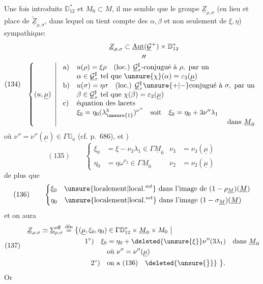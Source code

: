 Une fois introduits \(\mathbb D_{12}^{*}\) et \(M_0\subset M\), il me
semble que le groupe \(\underline Z_{\rho,\sigma}\) (en lieu
et place de \(\underline{\widetilde Z}_{\rho,\sigma}\), dans lequel on tient
compte des \(\alpha,\beta\) et non seulement
de \(\xi,\eta\))  sympathique:
\[
(134)\quad
\begin{gathered}
\underline Z_{\rho,\sigma}\subset
\underline{\operatorname{Aut}}(\underline{\mathcal G}^{+})\times\mathbb D_{12}^{*}
\\[-2pt]
\text{\(\prime\prime\)}\\[-2pt]
\left\{(u,\underline\mu)\ \left|\
\begin{array}{ll}
\text{a)}&u(\rho)=\xi\rho\quad\text{(loc.) }\underline{\mathcal G}_{\tau}^{\sharp}\text{-conjugué à }\rho,\text{ par un}\\
&\alpha\in\underline{\mathcal G}_{\tau}^{\sharp}\text{ tel que }\unsure{\chi}(\alpha)=\varepsilon_3(\underline\mu)\\
\text{b)}&u(\sigma)=\eta\sigma\quad\text{(loc.) }\underline{\mathcal G}_{\tau}^{\sharp}\unsure{+|-}\text{conjugué à }\sigma,\text{ par un}\\
&\beta\in\underline{\mathcal G}_{\tau}^{\sharp}\text{ tel que }\chi(\beta)=\varepsilon_2(\underline\mu)\\
\text{c)}&\text{équation des lacets}\\
&\xi_0=\eta_0(\lambda_{\unsure{1}}^3)^{\nu''}\quad\text{soit}\quad\xi_0=\eta_0+3\nu''\lambda_1\\
&\hfill\text{dans }\underline M_0
\end{array}\right.\right.
\end{gathered}
\]
où \(\nu''=\nu''(\underline\mu)\in\Gamma\mathbb G_a\)
(cf.  p.~686), et )
\[
(135)\qquad
\left\{\begin{aligned}
\xi_0&=\xi-\nu_3\lambda_1\in\Gamma\underline M_0
&\nu_3&=\nu_3(\underline\mu)\\
\eta_0&=\eta\omega^{\nu_2}\in\Gamma\underline M_0
&\nu_2&=\nu_2(\underline\mu)
\end{aligned}\right.
\]
   de plus que
\[
(136)\qquad
\left\{\begin{aligned}
&\xi_0\quad\text{\unsure{localement|local.\(^{mt}\)} dans l'image de }(1-\rho_{\underline M})(\underline M)\\
&\eta_0\quad\text{\unsure{localement|local.\(^{mt}\)} dans l'image }(1-\sigma_{\underline M})(\underline M)
\end{aligned}\right.
\]
et on aura
\[
(137)\quad
\begin{aligned}
\underline Z_{\rho,\sigma}\simeq\underline\Sigma_{\rho,\sigma}^{\mathrm{eff}}
\overset{\mathrm{dfn}}{=}
\bigl\{(\underline\mu,\xi_0,\eta_0)&\in\Gamma\mathbb D_{12}^{*}\times\underline M_0\times M_0\ \big|\\
1^\circ)\quad\xi_0&=\eta_0+\deleted{\unsure{\xi}}\nu''(3\lambda_1)\quad\text{dans }\underline M_0\\
&\text{où }\nu''=\nu''(\underline\mu)\\
2^\circ)\quad&\text{on a }(136)\quad\deleted{\unsure{\bigr\}}}\ \bigr\}.
\end{aligned}
\]
Or


